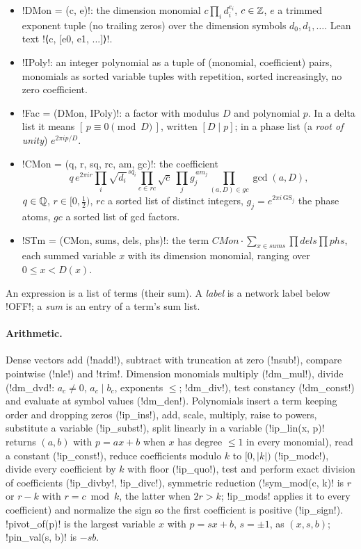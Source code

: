 {{{\begin{definition}\label{def:lean-export-sym-types}
\begin{itemize}
\item \lexpy!DMon = (c, e)!: the dimension monomial $c\prod_i d_i^{e_i}$, $c\in\mathbb{Z}$, $e$ a trimmed
exponent tuple (no trailing zeros) over the dimension symbols $d_0, d_1, \ldots$. Lean text
\lexlean!⟨c, [e0, e1, ...]⟩!.
\item \lexpy!IPoly!: an integer polynomial as a tuple of (monomial, coefficient) pairs, monomials
as sorted variable tuples with repetition, sorted increasingly, no zero coefficient.
\item \lexpy!Fac = (DMon, IPoly)!: a factor with modulus $D$ and polynomial $p$. In a delta list
it means $[\,p \equiv 0 \pmod D\,]$, written $[D \mid p]$; in a phase list (a \emph{root of
unity}) $e^{2\pi i p/D}$.
\item \lexpy!CMon = (q, r, sq, rc, am, gc)!: the coefficient
\[
q\, e^{2\pi i r} \prod_i \sqrt{d_i}^{\,sq_i} \prod_{c\in rc}\sqrt{c}\ \prod_j g_j^{\,am_j}
\prod_{(a, D)\in gc}\gcd(a, D),
\]
$q\in\mathbb{Q}$, $r\in[0,\tfrac12)$, $rc$ a sorted list of distinct integers, $g_j = e^{2\pi i\,
\mathrm{GS}_j}$ the phase atoms, $gc$ a sorted list of gcd factors.
\item \lexpy!STm = (CMon, sums, dels, phs)!: the term $\mathit{CMon}\cdot\sum_{x\in
\mathit{sums}}\prod \mathit{dels}\prod\mathit{phs}$, each summed variable $x$ with its
dimension monomial, ranging over $0 \le x < D(x)$.
\end{itemize}
An expression is a list of terms (their sum). A \emph{label} is a network label below
\lexpy!OFF!; a \emph{sum} is an entry of a term's sum list.
\end{definition}

\paragraph{Arithmetic.} Dense vectors add (\lexpy!nadd!), subtract with truncation at zero
(\lexpy!nsub!), compare pointwise (\lexpy!nle!) and \lexpy!trim!. Dimension monomials multiply
(\lexpy!dm_mul!), divide (\lexpy!dm_dvd!: $a_c\neq0$, $a_c\mid b_c$, exponents $\le$; \lexpy!dm_div!), test
constancy (\lexpy!dm_const!) and evaluate at symbol values (\lexpy!dm_den!). Polynomials insert a term
keeping order and dropping zeros (\lexpy!ip_ins!), add, scale, multiply, raise to powers,
substitute a variable (\lexpy!ip_subst!), split linearly in a variable (\lexpy!ip_lin(x, p)! returns
$(a, b)$ with $p = ax + b$ when $x$ has degree $\le 1$ in every monomial), read a constant
(\lexpy!ip_const!), reduce coefficients modulo $k$ to $[0,|k|)$ (\lexpy!ip_modc!), divide every
coefficient by $k$ with floor (\lexpy!ip_quo!), test and perform exact division of coefficients
(\lexpy!ip_divby!, \lexpy!ip_divc!), symmetric reduction (\lexpy!sym_mod(c, k)! is $r$ or $r-k$ with
$r=c\bmod k$, the latter when $2r>k$; \lexpy!ip_mods! applies it to every coefficient) and
normalize the sign so the first coefficient is positive (\lexpy!ip_sign!). \lexpy!pivot_of(p)! is the
largest variable $x$ with $p = sx + b$, $s = \pm1$, as $(x, s, b)$; \lexpy!pin_val(s, b)! is $-sb$.

}}}
